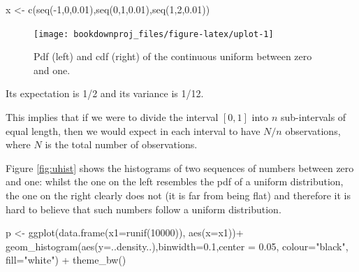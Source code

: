 \documentclass[
]{book}
\newenvironment{Shaded}{\begin{snugshade}}{\end{snugshade}}
\newcommand{\AttributeTok}[1]{\textcolor[rgb]{0.77,0.63,0.00}{#1}}
\newcommand{\DecValTok}[1]{\textcolor[rgb]{0.00,0.00,0.81}{#1}}
\newcommand{\FloatTok}[1]{\textcolor[rgb]{0.00,0.00,0.81}{#1}}
\newcommand{\FunctionTok}[1]{\textcolor[rgb]{0.00,0.00,0.00}{#1}}
\newcommand{\NormalTok}[1]{#1}
\newcommand{\OtherTok}[1]{\textcolor[rgb]{0.56,0.35,0.01}{#1}}
\newcommand{\SpecialCharTok}[1]{\textcolor[rgb]{0.00,0.00,0.00}{#1}}
\newcommand{\StringTok}[1]{\textcolor[rgb]{0.31,0.60,0.02}{#1}}
\begin{document}
\begin{Shaded}
\begin{Highlighting}[]
\NormalTok{x }\OtherTok{\textless{}{-}} \FunctionTok{c}\NormalTok{(}\FunctionTok{seq}\NormalTok{(}\SpecialCharTok{{-}}\DecValTok{1}\NormalTok{,}\DecValTok{0}\NormalTok{,}\FloatTok{0.01}\NormalTok{),}\FunctionTok{seq}\NormalTok{(}\DecValTok{0}\NormalTok{,}\DecValTok{1}\NormalTok{,}\FloatTok{0.01}\NormalTok{),}\FunctionTok{seq}\NormalTok{(}\DecValTok{1}\NormalTok{,}\DecValTok{2}\NormalTok{,}\FloatTok{0.01}\NormalTok{))}
\end{Highlighting}
\end{Shaded}

\begin{figure}

{\centering \texttt{[image: bookdownproj\_files/figure-latex/uplot-1]} 

}

\caption{Pdf (left) and cdf (right) of the continuous uniform between zero and one.}\label{fig:uplot}
\end{figure}

Its expectation is 1/2 and its variance is 1/12.

This implies that if we were to divide the interval \([0,1]\) into \(n\) sub-intervals of equal length, then we would expect in each interval to have \(N/n\) observations, where \(N\) is the total number of observations.

Figure \ref{fig:uhist} shows the histograms of two sequences of numbers between zero and one: whilst the one on the left resembles the pdf of a uniform distribution, the one on the right clearly does not (it is far from being flat) and therefore it is hard to believe that such numbers follow a uniform distribution.

\begin{Shaded}
\begin{Highlighting}[]
\NormalTok{p }\OtherTok{\textless{}{-}} \FunctionTok{ggplot}\NormalTok{(}\FunctionTok{data.frame}\NormalTok{(}\AttributeTok{x1=}\FunctionTok{runif}\NormalTok{(}\DecValTok{10000}\NormalTok{)), }\FunctionTok{aes}\NormalTok{(}\AttributeTok{x=}\NormalTok{x1))}\SpecialCharTok{+}
   \FunctionTok{geom\_histogram}\NormalTok{(}\FunctionTok{aes}\NormalTok{(}\AttributeTok{y=}\NormalTok{..density..),}\AttributeTok{binwidth=}\FloatTok{0.1}\NormalTok{,}\AttributeTok{center =} \FloatTok{0.05}\NormalTok{, }\AttributeTok{colour=}\StringTok{"black"}\NormalTok{, }\AttributeTok{fill=}\StringTok{"white"}\NormalTok{)  }\SpecialCharTok{+} \FunctionTok{theme\_bw}\NormalTok{() }
\end{Highlighting}
\end{Shaded}
\end{document}
